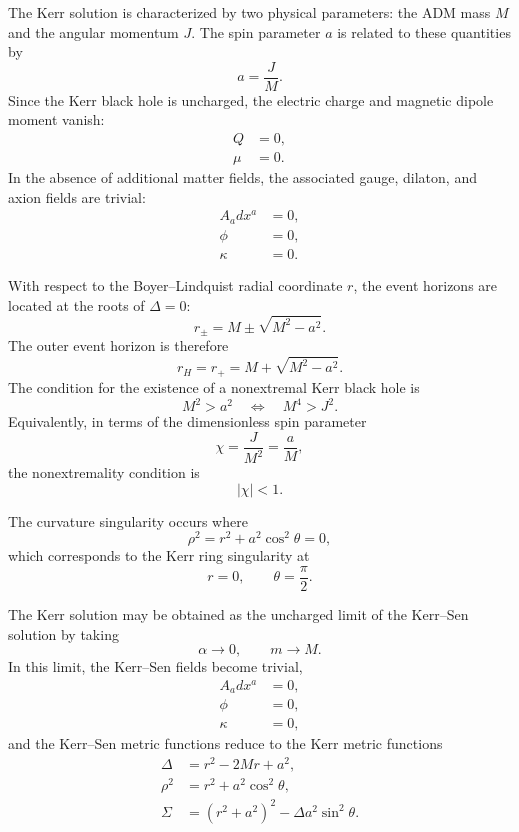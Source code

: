 The Kerr solution is characterized by two physical parameters: the ADM mass \(M\) and the angular momentum \(J\). The spin parameter \(a\) is related to these quantities by
\begin{equation}
a = \frac{J}{M}.
\end{equation}
Since the Kerr black hole is uncharged, the electric charge and magnetic dipole moment vanish:
\begin{align}
Q &= 0, \\
\mu &= 0 .
\end{align}
In the absence of additional matter fields, the associated gauge, dilaton, and axion fields are trivial:
\begin{align}
A_a dx^a &= 0, \\
\phi &= 0, \\
\kappa &= 0 .
\end{align}

With respect to the Boyer--Lindquist radial coordinate \(r\), the event horizons are located at the roots of \(\Delta=0\):
\begin{equation}
r_{\pm} = M \pm \sqrt{M^2-a^2}.
\end{equation}
The outer event horizon is therefore
\begin{equation}
r_H = r_+ = M+\sqrt{M^2-a^2}.
\end{equation}
The condition for the existence of a nonextremal Kerr black hole is
\begin{equation}
M^2 > a^2
\quad \Leftrightarrow \quad
M^4 > J^2 .
\end{equation}
Equivalently, in terms of the dimensionless spin parameter
\begin{equation}
\chi = \frac{J}{M^2} = \frac{a}{M},
\end{equation}
the nonextremality condition is
\begin{equation}
|\chi| < 1 .
\end{equation}

The curvature singularity occurs where
\begin{equation}
\rho^2 = r^2+a^2\cos^2\theta = 0,
\end{equation}
which corresponds to the Kerr ring singularity at
\begin{equation}
r=0,
\qquad
\theta=\frac{\pi}{2}.
\end{equation}

The Kerr solution may be obtained as the uncharged limit of the Kerr--Sen solution by taking
\begin{equation}
\alpha \to 0,
\qquad
m \to M .
\end{equation}
In this limit, the Kerr--Sen fields become trivial,
\begin{align}
A_a dx^a &= 0, \\
\phi &= 0, \\
\kappa &= 0,
\end{align}
and the Kerr--Sen metric functions reduce to the Kerr metric functions
\begin{align}
\Delta &= r^2 - 2Mr + a^2, \\
\rho^2 &= r^2+a^2\cos^2\theta, \\
\Sigma &= \left(r^2+a^2\right)^2-\Delta a^2\sin^2\theta .
\end{align}

